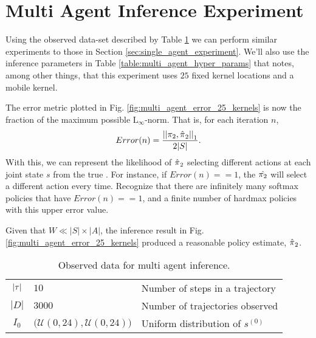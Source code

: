     \begin{figure}[H]
	\begin{center}
	\end{center}
\end{figure}

\section{Multi Agent Inference Experiment}\label{sec:multi_agent_inference_experiment}	
Using the observed data-set described by Table \ref{table:multi_agent_data_set} we can perform similar experiments to those in Section \ref{sec:single_agent_experiment}. We'll also use the inference parameters in Table \ref{table:multi_agent_hyper_params} that notes, among other things, that this experiment uses $25$ fixed kernel locations and a mobile kernel.

The error metric plotted in Fig. \ref{fig:multi_agent_error_25_kernels} is now the fraction of the maximum possible $\text{L}_{\infty}$-norm. That is, for each iteration $n$,
\[
	Error(n) = \frac{\left|\left|\pi_{2},\hat{\pi_{}}_2\right|\right|_1}{2|S|}.
\]
With this, we can represent the likelihood of $\hat{\pi_{}}_2$ selecting different actions at each joint state $s$ from the true . For instance, if $Error(n)==1$, the $\hat{\pi_{2}}$ will select a different action every time. Recognize that there are infinitely many softmax policies that have $Error(n)==1$, and a finite number of hardmax policies with this upper error value.

Given that $W \ll |S|\times |A|$, the inference result in Fig. \ref{fig:multi_agent_error_25_kernels} produced a reasonable policy estimate, $\hat{\pi_{}}_2$. 


    \begin{table}[H]
	\centering
	\begin{tabular}{c|l l}
		$|\tau|$ & $10$ & Number of steps in a trajectory \\
		$|D|$ & $3000$ & Number of trajectories observed \\
		$I_0$ & $\big(\mathcal{U}(0,24), \mathcal{U}(0,24)\big)$ & Uniform distribution of $s^{(0)}$ \\
	\end{tabular}
	\caption{Observed data for multi agent inference.}
	\label{table:multi_agent_data_set}
\end{table}

